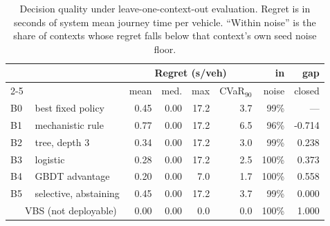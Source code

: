 \begin{table}[t]
\caption{Decision quality under leave-one-context-out evaluation. Regret is in
seconds of system mean journey time per vehicle. ``Within noise'' is the share
of contexts whose regret falls below that context's own seed noise floor.}
\label{tab:ladder}
\centering\footnotesize
\setlength{\tabcolsep}{3.5pt}
\begin{tabular}{@{}l r r r r r r@{}}
\toprule
& \multicolumn{4}{c}{Regret (s/veh)} & in & gap\\
\cmidrule(lr){2-5}
& mean & med. & max & CVaR$_{90}$ & noise & closed\\
\midrule
B0 ~~best fixed policy & 0.45 & 0.00 & 17.2 & 3.7 & 99\% & ---\\
B1 ~~mechanistic rule & 0.77 & 0.00 & 17.2 & 6.5 & 96\% & -0.714\\
B2 ~~tree, depth 3 & 0.34 & 0.00 & 17.2 & 3.0 & 99\% & 0.238\\
B3 ~~logistic & 0.28 & 0.00 & 17.2 & 2.5 & 100\% & 0.373\\
B4 ~~GBDT advantage & 0.20 & 0.00 & 7.0 & 1.7 & 100\% & 0.558\\
B5 ~~selective, abstaining & 0.45 & 0.00 & 17.2 & 3.7 & 99\% & 0.000\\
~~~VBS (not deployable) & 0.00 & 0.00 & 0.0 & 0.0 & 100\% & 1.000\\
\bottomrule
\end{tabular}
\end{table}